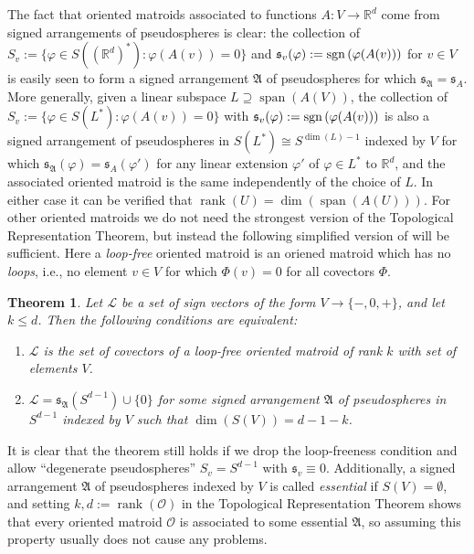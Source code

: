 \documentclass[a4paper,11pt,reqno, english]{amsart}
\newtheorem{theorem}{Theorem}[section]
\theoremstyle{definition}
\theoremstyle{remark}
\newcommand\R{\mathbb R}
\newcommand\sgn{{\rm sgn\,}}
\begin{document}
The fact that oriented matroids associated to functions $A\colon V\to\R^d$ come from signed arrangements of pseudospheres is clear: the collection of $S_v:=\{\varphi\in S((\R^d)^*):\varphi(A(v))=0\}$ and $\mathfrak{s}_v(\varphi):=\sgn(\varphi(A(v)))$ for $v\in V$ is easily seen to form a signed arrangement $\mathfrak{A}$ of pseudospheres for which $\mathfrak{s}_\mathfrak{A}=\mathfrak{s}_A$. More generally, given a linear subspace $L\supseteq\operatorname{span}(A(V))$, the collection of $S_v:=\{\varphi\in S(L^*):\varphi(A(v))=0\}$ with $\mathfrak{s}_v(\varphi):=\sgn(\varphi(A(v)))$ is also a signed arrangement of pseudospheres in $S(L^*)\cong S^{\dim(L)-1}$ indexed by $V$ for which $\mathfrak{s}_\mathfrak{A}(\varphi)=\mathfrak{s}_A(\varphi')$ for any linear extension $\varphi'$ of $\varphi\in L^*$ to $\R^d$, and the associated oriented matroid is the same independently of the choice of $L$. In either case it can be verified that $\operatorname{rank}(U)=\dim(\operatorname{span}(A(U)))$. For other oriented matroids we do not need the strongest version of the Topological Representation Theorem, but instead the following simplified version of \cite[Theorem 5.2.1]{OrientedMatroids} will be sufficient. Here a \emph{loop-free} oriented matroid is an oriened matroid which has no \emph{loops}, i.e., no element $v\in V$ for which $\Phi(v)=0$ for all covectors $\Phi$.
\begin{theorem}\label{thm:top-repr}
    Let $\mathscr{L}$ be a set of sign vectors of the form $V\to\{-,0,+\}$, and let $k\leq d$. Then the following conditions are equivalent:
    \begin{enumerate}[label=\normalfont{(\roman*)}]
        \item $\mathscr{L}$ is the set of covectors of a loop-free oriented matroid of rank $k$ with set of elements $V$.
        \item $\mathscr{L}=\mathfrak{s}_\mathfrak{A}(S^{d-1})\cup\{0\}$ for some signed arrangement $\mathfrak{A}$ of pseudospheres in $S^{d-1}$ indexed by $V$ such that $\dim(S(V))=d-1-k$.
    \end{enumerate}
\end{theorem}
It is clear that the theorem still holds if we drop the loop-freeness condition and allow ``degenerate pseudospheres'' $S_v=S^{d-1}$ with $\mathfrak{s}_v\equiv 0$. Additionally, a signed arrangement $\mathfrak{A}$ of pseudospheres indexed by $V$ is called \emph{essential} if $S(V)=\emptyset$, and setting $k,d:=\operatorname{rank}(\mathscr{O})$ in the Topological Representation Theorem shows that every oriented matroid $\mathscr{O}$ is associated to some essential $\mathfrak{A}$, so assuming this property usually does not cause any problems. 
\end{document}
